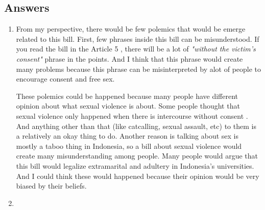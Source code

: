 \documentclass[12pt]{article}
\begin{document}
    \subsection*{Answers}
    \begin{enumerate}
        \item 


            From my perspective, there would be few polemics that would be
            emerge related to this bill. First, few phrases inside this bill can
            be misunderstood. If you read the bill in the Article 5 \parencite{kementerianpendidikandankebudayaanPeraturanMenteri302021},
            there will be a lot of \emph{"without the victim's consent"} phrase in the
            points. And I think that this phrase would create many problems
            because this phrase can be misinterpreted by alot of people to
            encourage consent and free sex. 

            These polemics could be happened because many people have different
            opinion about what sexual violence is about. Some people thought
            that sexual violence only happened when there is intercourse without
            consent \parencite{chandraNadiemMakarimSexual2021}. And anything other than that (like catcalling, sexual
            assault, etc) to them is a relatively an okay thing to do. Another reason
            is talking about sex is mostly a taboo thing in Indonesia, so a bill
            about sexual violence would create many misunderstanding among people.
            Many people would argue that this bill would legalize extramarital
            and adultery in Indonesia's universities. And I could think these
            would happened because their opinion would be very biased by
            their beliefs.

        \item

    \end{enumerate}
\end{document}
